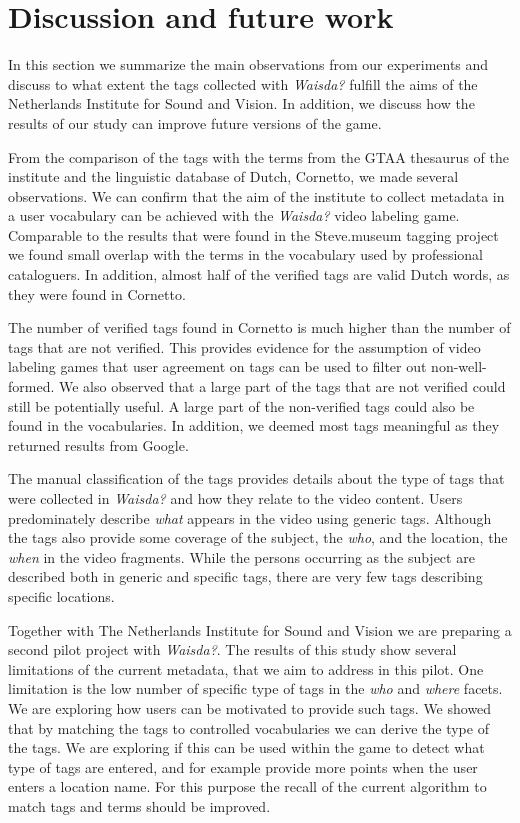 \section{Discussion and future work}
\label{sec:discussion}

In this section we summarize the main observations from our experiments and
discuss to what extent the tags collected with \emph{Waisda?} fulfill the aims
of the Netherlands Institute for Sound and Vision. In addition, we discuss how
the results of our study can improve future versions of the game.

From the comparison of the tags with the terms from the GTAA thesaurus of the
institute and the linguistic database of Dutch, Cornetto, we made several
observations. We can confirm that the aim of the institute to collect metadata
in a user vocabulary can be achieved with the \emph{Waisda?} video labeling game.
Comparable to the results that were found in the Steve.museum tagging project
we found small overlap with the terms in the vocabulary used by professional
cataloguers. In addition, almost half of the verified tags are valid Dutch
words, as they were found in Cornetto. 

The number of verified tags found in Cornetto is much higher than the
number of tags that are not verified. This provides evidence
for the assumption of video labeling games that user agreement on tags can be
used to filter out non-well-formed. We also observed that a large part of
the tags that are not verified could still be potentially useful. A large part
of the non-verified tags could also be found in the vocabularies. In addition,
we deemed most tags meaningful as they returned results from Google.

The manual classification of the tags provides details about the type of tags
that were collected in \emph{Waisda?} and how they relate to the video
content. Users predominately describe \emph{what} appears in the video using
generic tags. Although the tags also provide some coverage of the subject, the
\emph{who}, and the location, the \emph{when} in the video fragments. While
the persons occurring as the subject are described both in generic and
specific tags, there are very few tags describing specific locations.

Together with The Netherlands Institute for Sound and Vision we are preparing
a second pilot project with \emph{Waisda?}. The results of this study show
several limitations of the current metadata, that we aim to address in this
pilot. One limitation is the low number of specific type of tags in the
\emph{who} and \emph{where} facets. We are exploring how users can be
motivated to provide such tags. We showed that by matching the tags to
controlled vocabularies we can derive the type of the tags. We are exploring
if this can be used within the game to detect what type of tags are entered,
and for example provide more points when the user enters a location name. For
this purpose the recall of the current algorithm to match tags and terms
should be improved.

